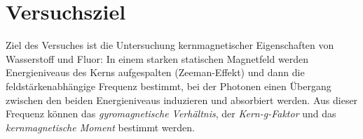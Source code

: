 \section{Versuchsziel}
Ziel des Versuches ist die Untersuchung kernmagnetischer Eigenschaften von Wasserstoff und Fluor:
In einem starken statischen Magnetfeld werden Energieniveaus des Kerns aufgespalten (Zeeman-Effekt)
und dann die feldstärkenabhängige Frequenz bestimmt, bei der Photonen einen Übergang
zwischen den beiden Energieniveaus induzieren und absorbiert werden.
Aus dieser Frequenz können das \emph{gyromagnetische Verhältnis},
der \emph{Kern-g-Faktor} und das \emph{kernmagnetische Moment} bestimmt werden.